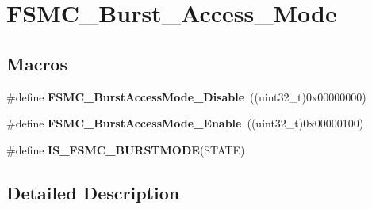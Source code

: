 \hypertarget{group___f_s_m_c___burst___access___mode}{\section{F\-S\-M\-C\-\_\-\-Burst\-\_\-\-Access\-\_\-\-Mode}
\label{group___f_s_m_c___burst___access___mode}
}
\subsection*{Macros}
\begin{DoxyCompactItemize}
\item 
\hypertarget{group___f_s_m_c___burst___access___mode_ga26fc544945415e350563a9b00684850c}{\#define {\bfseries F\-S\-M\-C\-\_\-\-Burst\-Access\-Mode\-\_\-\-Disable}~((uint32\-\_\-t)0x00000000)}\label{group___f_s_m_c___burst___access___mode_ga26fc544945415e350563a9b00684850c}

\item 
\hypertarget{group___f_s_m_c___burst___access___mode_ga841831dfacfdd8889dafe26cc594bf02}{\#define {\bfseries F\-S\-M\-C\-\_\-\-Burst\-Access\-Mode\-\_\-\-Enable}~((uint32\-\_\-t)0x00000100)}\label{group___f_s_m_c___burst___access___mode_ga841831dfacfdd8889dafe26cc594bf02}

\item 
\#define {\bfseries I\-S\-\_\-\-F\-S\-M\-C\-\_\-\-B\-U\-R\-S\-T\-M\-O\-D\-E}(S\-T\-A\-T\-E)
\end{DoxyCompactItemize}


\subsection{Detailed Description}


